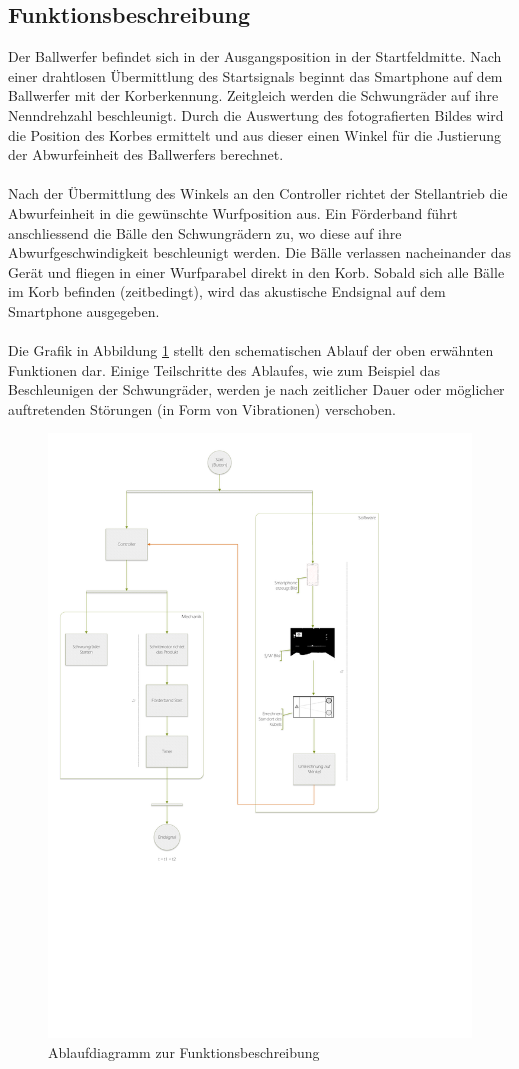 \subsection{Funktionsbeschreibung}
Der Ballwerfer befindet sich in der Ausgangsposition in der Startfeldmitte. 
Nach einer drahtlosen Übermittlung des Startsignals beginnt das Smartphone auf 
dem Ballwerfer mit der Korberkennung. Zeitgleich werden die Schwungräder auf 
ihre Nenndrehzahl beschleunigt. Durch die Auswertung des fotografierten Bildes 
wird die Position des Korbes ermittelt und aus dieser einen Winkel für die 
Justierung der Abwurfeinheit des Ballwerfers berechnet.\\
\\
Nach der Übermittlung des Winkels an den Controller richtet der Stellantrieb 
die Abwurfeinheit in die gewünschte Wurfposition aus. Ein Förderband führt 
anschliessend die Bälle den Schwungrädern zu, wo diese auf ihre 
Abwurfgeschwindigkeit beschleunigt werden. Die Bälle verlassen nacheinander 
das Gerät und fliegen in einer Wurfparabel direkt in den Korb. Sobald sich 
alle Bälle im Korb befinden (zeitbedingt), wird das akustische Endsignal 
auf dem Smartphone ausgegeben.\\
\\
Die Grafik in Abbildung \ref{fig:FlowChart} stellt den 
schematischen Ablauf der oben erwähnten Funktionen dar. Einige Teilschritte 
des Ablaufes, wie zum Beispiel das Beschleunigen der Schwungräder, werden 
je nach zeitlicher Dauer oder möglicher auftretenden Störungen (in Form von 
Vibrationen) verschoben.
%
\begin{figure}[h!]
	\centering
	\includegraphics[width=1\textwidth,clip,trim=10mm 169mm 89mm 15mm]
	{Enddokumentation/Loesungskonzept/Bilder/FlowOnChart_v2.pdf}
	\caption{Ablaufdiagramm zur Funktionsbeschreibung}
	\label{fig:FlowChart}
\end{figure}
\clearpage